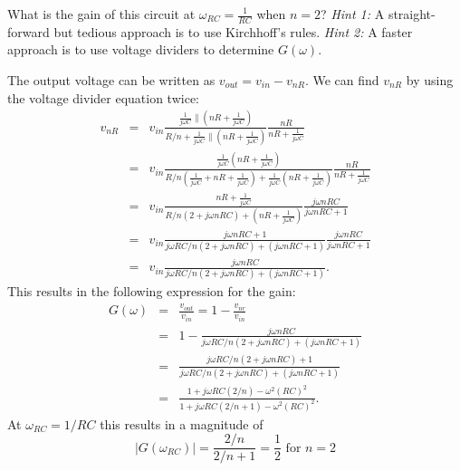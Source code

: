 \documentclass[letterpaper,addpoints]{exam}
\begin{document}
\begin{questions}
\begin{question}
\begin{parts}
  \bonuspart[10]
   What is the gain of this circuit at $\omega_{RC} = \frac{1}{RC}$ when $n = 2$? \emph{Hint 1:} A straight-forward but tedious approach is to use Kirchhoff's rules. \emph{Hint 2:} A faster approach is to use voltage dividers to determine $G(\omega)$.
  \begin{solution}[4.0in]
   The output voltage can be written as $v_{out} = v_{in} - v_{nR}$.  We can find $v_{nR}$ by using the voltage divider equation twice:
   \begin{eqnarray*}
   v_{nR} & = & v_{in} \frac{\frac{1}{j\omega C} \parallel (nR + \frac{1}{j\omega C})}{R/n + \frac{1}{j\omega C} \parallel (nR + \frac{1}{j\omega C})} \frac{nR}{nR + \frac{1}{j\omega C}} \\
   & = & v_{in} \frac{\frac{1}{j\omega C} (nR + \frac{1}{j\omega C})}{R/n (\frac{1}{j\omega C} + nR + \frac{1}{j\omega C}) + \frac{1}{j\omega C} (nR + \frac{1}{j\omega C})} \frac{nR}{nR + \frac{1}{j\omega C}} \\
   & = & v_{in} \frac{nR + \frac{1}{j\omega C}}{R/n (2 + j\omega n R C) + (nR + \frac{1}{j\omega C})} \frac{j \omega n R C}{j \omega n R C + 1} \\
   & = & v_{in} \frac{j \omega n R C + 1}{j \omega R C /n (2 + j \omega n R C) + (j \omega n R C + 1)} \frac{j \omega n R C}{j \omega n R C + 1} \\
   & = & v_{in} \frac{j \omega n R C}{j \omega R C /n (2 + j \omega n R C) + (j \omega n R C + 1)}.
   \end{eqnarray*}
   This results in the following expression for the gain:
   \begin{eqnarray*}
    G(\omega) & = & \frac{v_{out}}{v_{in}} = 1 - \frac{v_{nr}}{v_{in}} \\
    & = & 1 - \frac{j \omega n R C}{j \omega R C /n (2 + j \omega n R C) + (j \omega n R C + 1)} \\
    & = & \frac{j \omega R C /n (2 + j \omega n R C) + 1}{j \omega R C /n (2 + j \omega n R C) + (j \omega n R C + 1)} \\
    & = & \frac{1 + j \omega R C (2 / n) - \omega^2 (R C)^2}{1 + j \omega R C (2 / n + 1) - \omega^2 (R C)^2}.
   \end{eqnarray*}
   At $\omega_{RC} = 1/RC$ this results in a magnitude of
   \begin{equation*}
    |G(\omega_{RC})| = \frac{2 / n}{2 / n + 1} = \frac{1}{2} \mbox{ for } n=2
   \end{equation*}
  \end{solution}
 
 \end{parts}
\end{question}

\end{questions}
\end{document}
